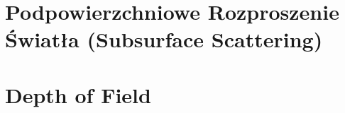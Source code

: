 \section{Podpowierzchniowe Rozproszenie Światła (Subsurface Scattering)}



\section{Depth of Field}
